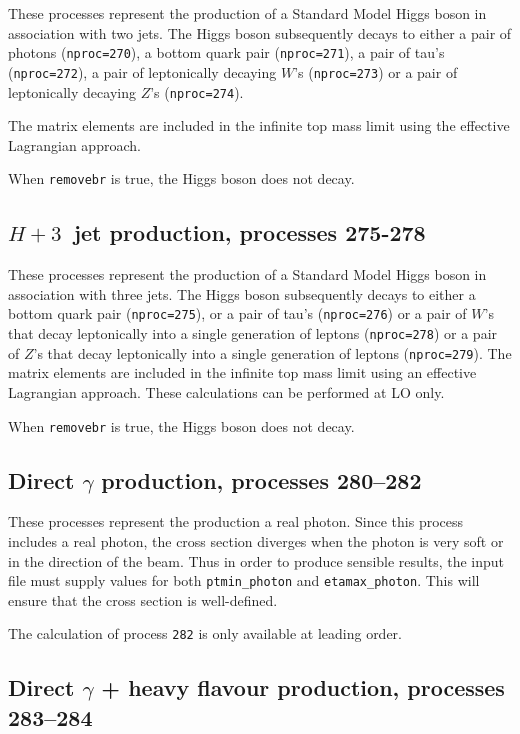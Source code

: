 \documentclass[12pt]{article}
\begin{document}
These processes represent the production of a Standard Model Higgs boson
in association with two jets. The Higgs boson
subsequently decays to either a pair of photons ({\tt nproc=270}), a bottom quark pair ({\tt nproc=271}), 
a pair of tau's ({\tt nproc=272}), a pair of leptonically decaying $W$'s ({\tt nproc=273}) 
or a pair of leptonically decaying $Z$'s ({\tt nproc=274}).

The matrix elements are included in the infinite top mass limit
using the effective Lagrangian approach. 

When {\tt removebr} is true, the Higgs boson does not decay.

\subsection{$H + 3$~jet production, processes 275-278}

These processes represent the production of a Standard Model Higgs boson
in association with three jets. The Higgs boson
subsequently decays to either a bottom quark pair ({\tt nproc=275}), 
or a pair of tau's ({\tt nproc=276})
or a pair of $W$'s that decay leptonically into a single generation of leptons ({\tt nproc=278})
or a pair of $Z$'s that decay leptonically into a single generation of leptons ({\tt nproc=279}).
The matrix elements are included in the infinite top mass limit
using an effective Lagrangian approach. These calculations can be
performed at LO only.

When {\tt removebr} is true, the Higgs boson does not decay.

\subsection{Direct $\gamma$ production, processes 280--282}
\label{subsec:dirphot}

These processes represent the production a real photon.
Since this process includes a real photon, the cross section diverges
when the photon is very soft or in the direction of the beam.
Thus in order to produce sensible results, the input file must supply values for both
{\tt ptmin\_photon} and {\tt etamax\_photon}. This will ensure that
the cross section is well-defined.

The calculation of process {\tt 282} is only available at leading order.

\subsection{Direct $\gamma$ + heavy flavour production, processes 283--284}
\label{subsec:heavyfl}
\end{document}
